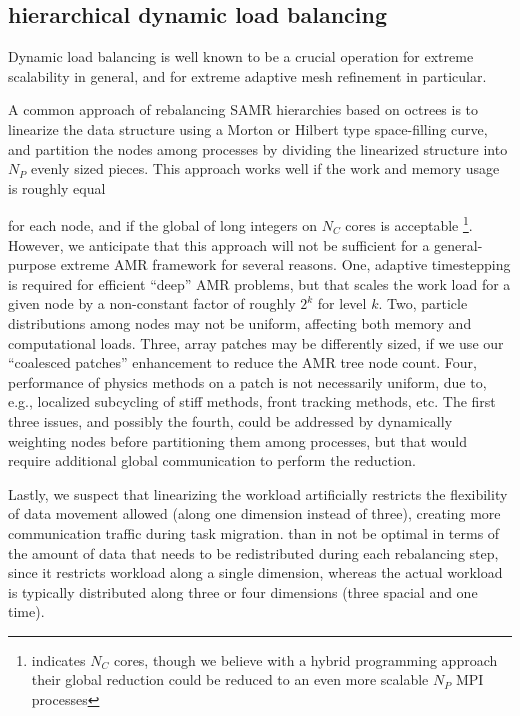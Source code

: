 \documentclass[14pt,letter]{article}
\begin{document}
\subsection{hierarchical dynamic load balancing}

Dynamic load balancing is well known to be a crucial operation for
extreme scalability in general, and for extreme adaptive mesh
refinement in particular.

A common approach of rebalancing SAMR hierarchies based on octrees is
to linearize the data structure using a Morton or Hilbert type
space-filling curve, and partition the nodes among processes by
dividing the linearized structure into $N_P$ evenly sized pieces.
This approach works well if the work and memory usage is roughly equal

for each node, and if the global  of long
integers on $N_C$ cores is acceptable \footnote{\cite{BuGh08}
  indicates $N_C$ cores, though we believe with a hybrid programming
  approach their global reduction could be reduced to an even more
  scalable $N_P$ MPI processes}.  However, we anticipate that this
approach will not be sufficient for a general-purpose extreme AMR
framework for several reasons.
%
One, adaptive timestepping is required for efficient ``deep'' AMR
problems, but that scales the work load for a given node by a
non-constant factor of roughly $2^k$ for level $k$.
%
Two, particle distributions among nodes may not be uniform, affecting both memory and computational loads.
%
Three, array patches may be differently sized, if we use our ``coalesced patches'' enhancement to reduce the AMR tree node count.  
%
Four, performance of physics methods on a patch is not necessarily
uniform, due to, e.g., localized subcycling of stiff methods, front
tracking methods, etc.  The first three issues, and possibly the
fourth, could be addressed by dynamically weighting nodes before
partitioning them among processes, but that would require additional
global communication to perform the reduction.
%

Lastly, we suspect that linearizing the workload artificially
restricts the flexibility of data movement allowed (along one
dimension instead of three), creating more communication traffic
during task migration.  than in not be optimal in terms of the amount
of data that needs to be redistributed during each rebalancing step,
since it restricts workload along a single dimension, whereas the
actual workload is typically distributed along three or four
dimensions (three spacial and one time).
\end{document}
